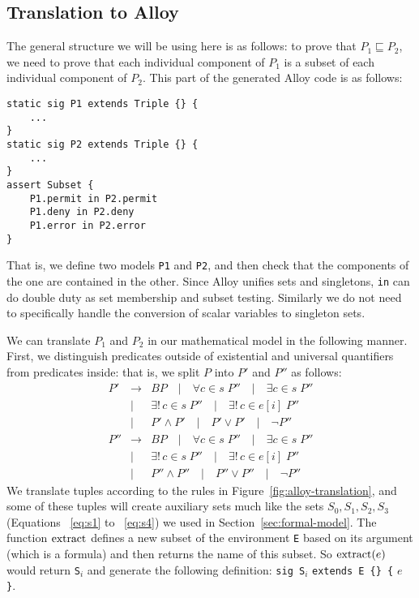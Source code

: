 \subsection{Translation to Alloy}
\label{sec:translation-alloy}

The general structure we will be using here is as follows: to prove
that $P_1 \sqsubseteq P_2$, we need to prove that each individual
component of $P_1$ is a subset of each individual component of $P_2$.
This part of the generated Alloy code is as follows:
\begin{verbatim}
static sig P1 extends Triple {} {
    ...
}
static sig P2 extends Triple {} {
    ...
}
assert Subset {
    P1.permit in P2.permit
    P1.deny in P2.deny
    P1.error in P2.error
}
\end{verbatim}
That is, we define two models \texttt{P1} and \texttt{P2}, and then
check that the components of the one are contained in the other.
Since Alloy unifies sets and singletons, \texttt{in} can do double
duty as set membership and subset testing.  Similarly we do not need
to specifically handle the conversion of scalar variables to singleton
sets.

We can translate $P_1$ and $P_2$ in our mathematical model in the
following manner. First, we distinguish predicates outside of
existential and universal quantifiers from predicates inside: that is,
we split $P$ into $P'$ and $P''$ as follows:
\begin{eqnarray*}
  P' & \rightarrow & BP \quad | \quad \forall c \in s \; P'' \quad |
  \quad \exists c \in s \; P'' \\
  & | & \exists ! \, c \in s \; P'' \quad | 
  \quad \exists ! \, c \in e[i] \; P'' \\
  & | & P' \wedge P' \quad | \quad P' \vee P' \quad | \quad \neg P'' \\
  P'' & \rightarrow & BP \quad | \quad \forall c \in s \; P'' \quad |
  \quad \exists c \in s \; P'' \\
  & | & \exists ! \, c \in s \; P'' \quad | \quad 
  \exists ! \, c \in e[i] \; P'' \\
  & | & P'' \wedge P'' \quad | \quad P'' \vee P'' \quad | \quad \neg P''
\end{eqnarray*}
We translate tuples according to the rules in
Figure~\ref{fig:alloy-translation}, and some of these tuples will
create auxiliary sets much like the sets $S_0, S_1, S_2, S_3$
(Equations ~\eqref{eq:s1} to ~\eqref{eq:s4}) we used in
Section~\ref{sec:formal-model}.  The function $\operatorname{extract}$ defines a new
subset of the environment \texttt{E} based on its argument (which is a
formula) and then returns the name of this subset.  So $\operatorname{extract}(e)$
would return \texttt{S$_i$} and generate the following definition:
\verb|sig S|$_i$ \verb|extends E {} {| $e$ \verb|}|.


